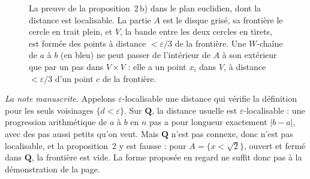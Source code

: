 \begin{figure}[htbp]
\centering
{}
\caption{La preuve de la proposition~2\,b) dans le plan euclidien, dont la distance est localisable. La partie $A$ est le disque grisé, sa frontière le cercle en trait plein, et $V$, la bande entre les deux cercles en tirets, est formée des points à distance $< \varepsilon/3$ de la frontière. Une $W$-chaîne de $a$ à $b$ (en bleu) ne peut passer de l'intérieur de $A$ à son extérieur que par un pas dans $V \times V$ : elle a un point $x_i$ dans $V$, à distance $< \varepsilon/3$ d'un point $c$ de la frontière.}
\label{fig:bourbaki-402}
\end{figure}

\emph{La note manuscrite.} Appelons $\varepsilon$-localisable une distance qui vérifie la définition pour les seuls voisinages $\{d < \varepsilon\}$. Sur $\mathbf Q$, la distance usuelle est $\varepsilon$-localisable : une progression arithmétique de $a$ à $b$ en $n$ pas a pour longueur exactement $|b - a|$, avec des pas aussi petits qu'on veut. Mais $\mathbf Q$ n'est pas connexe, donc n'est pas localisable, et la proposition~2 y est fausse : pour $A = \{x < \sqrt 2\}$, ouvert et fermé dans $\mathbf Q$, la frontière est vide. La forme proposée en regard ne suffit donc pas à la démonstration de la page.

